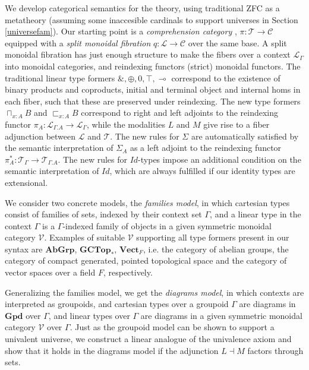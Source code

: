 We develop categorical semantics for the theory, using traditional ZFC as a metatheory (assuming some inaccesible cardinals to support universes in Section \ref{universefam}). Our starting point is a \textit{comprehension category} \cite{jacobs}, $\pi : \mathcal{T} \to \mathcal{C}$ equipped with a \textit{split monoidal fibration} $q : \mathcal{L} \to \mathcal{C}$ over the same base. A split monoidal fibration has just enough structure to make the fibers over a context $\mathcal{L}_\Gamma$ into monoidal categories, and reindexing functors (strict) monoidal functors. The traditional linear type formers $\&, \oplus, 0, \top, \multimap$ correspond to the existence of binary products and coproducts, initial and terminal object and internal homs in each fiber, such that these are preserved under reindexing. The new type formers $\sqcap_{x : A}B$ and $\sqsubset_{x :A}B$ correspond to right and left adjoints to the reindexing functor $\pi_A : \mathcal{L}_{\Gamma.A} \to \mathcal{L}_\Gamma$, while the modalities $L$ and $M$ give rise to a fiber adjunction between $\mathcal{L}$ and $\mathcal{T}$. The new rules for $\Sigma$ are automatically satisfied by the semantic interpretation of $\Sigma_A$ as a left adjoint to the reindexing functor $\pi_A^* : \mathcal{T}_\Gamma \to \mathcal{T}_{\Gamma.A}$. The new rules for $Id$-types impose an additional condition on the semantic interpretation of $Id$, which are always fulfilled if our identity types are extensional.

We consider two concrete models, the \textit{families model}, in which cartesian types consist of families of sets, indexed by their context set $\Gamma$, and a linear type in the context $\Gamma$ is a $\Gamma$-indexed family of objects in a given symmetric monoidal category $\mathcal{V}$. Examples of suitable $\mathcal{V}$ supporting all type formers present in our syntax are $\mathbf{AbGrp}$, $\mathbf{GCTop}_*$, $\mathbf{Vect}_F$, i.e. the category of abelian groups, the category of compact generated, pointed topological space and the category of vector spaces over a field $F$, respectively.

Generalizing the families model, we get the \textit{diagrams model}, in which contexts are interpreted as groupoids, and cartesian types over a groupoid $\Gamma$ are diagrams in $\mathbf{Gpd}$ over $\Gamma$, and linear types over $\Gamma$ are diagrams in a given symmetric monoidal category $\mathcal{V}$ over $\Gamma$. Just as the groupoid model \cite{hofmann1998} can be shown to support a univalent universe, we construct a linear analogue of the univalence axiom and show that it holds in the diagrams model if the adjunction $L \dashv M$ factors through sets.

